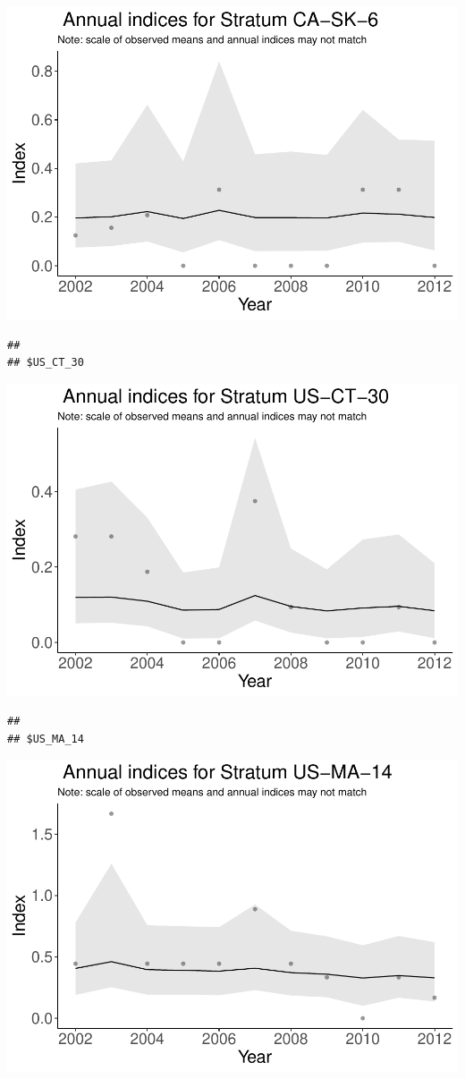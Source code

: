 \documentclass[]{article}
\begin{document}
\includegraphics{index_files/figure-latex/unnamed-chunk-7-15.pdf}

\begin{verbatim}
## 
## $US_CT_30
\end{verbatim}

\includegraphics{index_files/figure-latex/unnamed-chunk-7-16.pdf}

\begin{verbatim}
## 
## $US_MA_14
\end{verbatim}

\includegraphics{index_files/figure-latex/unnamed-chunk-7-17.pdf}
\end{document}
